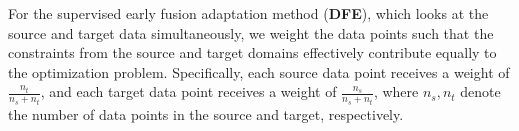 







  For the supervised early fusion adaptation method (\textbf{DFE}), which looks at the source and target data
  simultaneously, we weight 
  the data points such that the constraints from the source and target domains
 effectively contribute equally to the optimization problem.  Specifically,
  each source data point receives a weight of $\frac{n_t}{n_s+n_t}$, and each target
  data point receives a weight of $\frac{n_s}{n_s+n_t}$, where $n_s,n_t$ denote the
  number of data points in the source and target, respectively.
  
